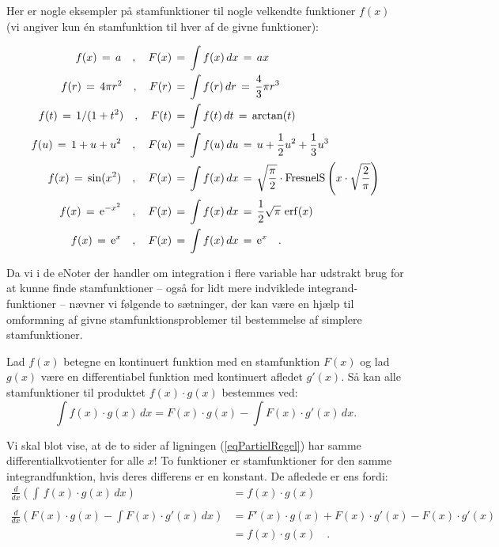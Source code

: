 Her er nogle eksempler på stamfunktioner til nogle velkendte funktioner $f(x)$ (vi angiver kun \'{e}n stamfunktion til hver af de givne funktioner):


\begin{equation}
\begin{aligned}
f(x) \, = \, a \quad , \quad F(x) \, &= \, \int  f(x) \,dx \, = \, ax\\
f(r) \, = \, 4\pi r^{2} \quad , \quad F(r) \,&= \, \int  f(r) \,dr \, = \, \dfrac{4}{3}\pi r^{3}\\
f(t) \, = \, 1/(1+t^{2}) \quad , \quad F(t) \,&= \, \int  f(t) \,dt \, = \, \arctan(t)\\
f(u) \, = \, 1 + u + u^{2} \quad , \quad F(u) \,&= \, \int  f(u) \,du \, = \, u +
\dfrac{1}{2}u^{2} + \dfrac{1}{3}u^{3}\\
f(x) \, = \, \sin(x^{2}) \quad , \quad F(x) \,&= \, \int  f(x) \,dx \, = \, \sqrt{\frac{\pi}{2}}\cdot \operatorname{FresnelS}\left(x\cdot \sqrt{\frac{2}{\pi}}\right)\\
f(x) \, = \, \mathrm{e}^{-x^{2}} \quad , \quad F(x) \,&= \, \int  f(x) \,dx \, = \, \frac{1}{2}\sqrt{\pi}\,\operatorname{erf}(x) \\
f(x) \, = \, \mathrm{e}^{x} \quad , \quad F(x) \,&= \, \int  f(x) \,dx \, = \, \mathrm{e}^{x}   \quad .
\end{aligned}
\end{equation}

Da vi i de eNoter der handler om integration i flere variable har udstrakt brug for at kunne finde stamfunktioner -- også for lidt mere indviklede integrand-funktioner -- nævner vi følgende to sætninger, der kan være en hjælp til omformning af givne stamfunktionsproblemer til bestemmelse af simplere stamfunktioner.

\begin{theorem}\label{thmPartielInt}
Lad $f(x)$ betegne en kontinuert funktion med en stamfunktion $F(x)$ og lad $g(x)$ være en differentiabel funktion med kontinuert afledet $g'(x)$. Så kan alle stamfunktioner til produktet $f(x)\cdot g(x)$ bestemmes ved:
\begin{equation}\label{eqPartielRegel}
\int f(x)\cdot g(x) \, dx = F(x)\cdot g(x) - \int  F(x)\cdot g'(x) \, dx.
\end{equation}
\end{theorem}
\begin{bevis}
Vi skal blot vise, at de to sider af ligningen (\ref{eqPartielRegel}) har samme differentialkvotienter for alle $x$! To funktioner er stamfunktioner for den samme integrandfunktion, hvis deres differens er en konstant. De afledede er ens fordi:
\begin{equation}
\begin{aligned}
\frac{d}{dx}\left(\int\, f(x)\cdot g(x) \, dx\right) &= f(x)\cdot g(x) \\ \\
\frac{d}{dx}\left( F(x)\cdot g(x) - \int F(x)\cdot g'(x) \, dx \right) &= F'(x)\cdot g(x) + F(x)\cdot g'(x) -  F(x)\cdot g'(x)\\
&=  f(x)\cdot g(x) \quad .
\end{aligned}
\end{equation}
\end{bevis}

